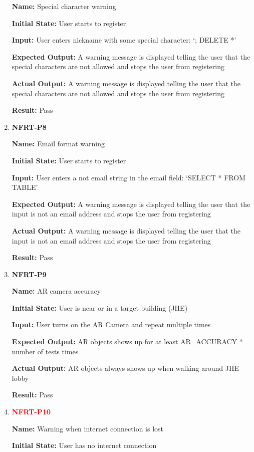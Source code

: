 \documentclass[12pt, titlepage]{article}
\begin{document}
\begin{enumerate}
\textbf{Name:} Special character warning

\textbf{Initial State:} User starts to register
					
\textbf{Input:} User enters nickname with some special character: `; DELETE *'
					
\textbf{Expected Output:} A warning message is displayed telling the user that the special characters are not allowed and stops the user from registering

\textbf{Actual Output:} A warning message is displayed telling the user that the special characters are not allowed and stops the user from registering

\textbf{Result:} Pass

\item \textbf{NFRT-P8}

\textbf{Name:} Email format warning

\textbf{Initial State:} User starts to register
					
\textbf{Input:} User enters a not email string in the email field:
`SELECT * FROM TABLE'
					
\textbf{Expected Output:} A warning message is displayed telling the user that the input is not an email address and stops the user from registering

\textbf{Actual Output:} A warning message is displayed telling the user that the input is not an email address and stops the user from registering

\textbf{Result:} Pass

\item \textbf{NFRT-P9}

\textbf{Name:} AR camera accuracy

\textbf{Initial State:} User is near or in a target building (JHE)
					
\textbf{Input:} User turns on the AR Camera and repeat multiple times
					
\textbf{Expected Output:} AR objects shows up for at least AR\_ACCURACY * number of tests times

\textbf{Actual Output:} AR objects always shows up when walking around JHE lobby

\textbf{Result:} Pass

\item \textbf{\textcolor{red}{NFRT-P10}}

\textbf{Name:} Warning when internet connection is lost

\textbf{Initial State:} User has no internet connection
					

\end{enumerate}
\end{document}
